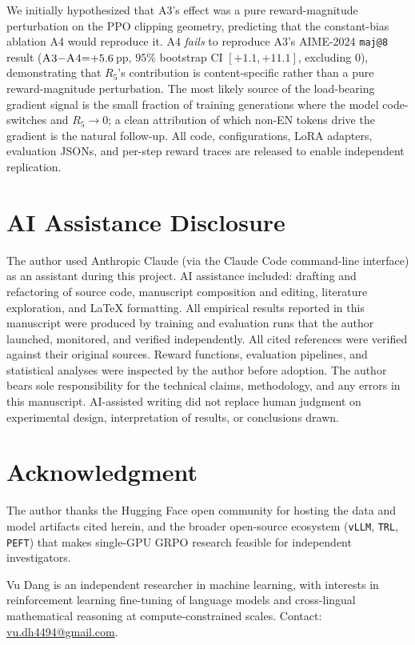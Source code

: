 \documentclass[journal,onecolumn,11pt]{IEEEtran}
\newcommand{\armC}{\textsc{A3}}
\newcommand{\armD}{\textsc{A4}}
\newcommand{\R}[1]{R_{#1}}
\begin{document}
We initially hypothesized that \armC{}'s effect was a pure
reward-magnitude perturbation on the PPO clipping geometry, predicting
that the constant-bias ablation \armD{} would reproduce it. \armD{}
\emph{fails} to reproduce \armC{}'s AIME-2024 \texttt{maj@8} result
($\armC{}{-}\armD{}{=}{+}5.6$\,pp, $95\%$ bootstrap CI
$[+1.1, +11.1]$, excluding $0$), demonstrating that $\R{5}$'s
contribution is content-specific rather than a pure reward-magnitude
perturbation. The most likely source of the load-bearing gradient
signal is the small fraction of training generations where the model
code-switches and $\R{5}\to 0$; a clean attribution of which non-EN
tokens drive the gradient is the natural follow-up. All code,
configurations, LoRA adapters, evaluation JSONs, and per-step reward
traces are released to enable independent replication.

\section*{AI Assistance Disclosure}
The author used Anthropic Claude (via the Claude Code command-line interface)
as an assistant during this project. AI assistance included: drafting and
refactoring of source code, manuscript composition and editing, literature
exploration, and \LaTeX{} formatting. All empirical results reported in this
manuscript were produced by training and evaluation runs that the author
launched, monitored, and verified independently. All cited references were
verified against their original sources. Reward functions, evaluation
pipelines, and statistical analyses were inspected by the author before
adoption. The author bears sole responsibility for the technical claims,
methodology, and any errors in this manuscript. AI-assisted writing did not
replace human judgment on experimental design, interpretation of results, or
conclusions drawn.

\section*{Acknowledgment}
The author thanks the Hugging Face open community for hosting the data and
model artifacts cited herein, and the broader open-source ecosystem
(\texttt{vLLM}, \texttt{TRL}, \texttt{PEFT}) that makes single-GPU GRPO
research feasible for independent investigators.




\vspace{4pt}
\begin{IEEEbiographynophoto}{Vu Dang}
is an independent researcher in machine learning, with interests in
reinforcement learning fine-tuning of language models and cross-lingual
mathematical reasoning at compute-constrained scales. Contact:
\href{mailto:vu.dh4494@gmail.com}{vu.dh4494@gmail.com}.
\end{IEEEbiographynophoto}
\end{document}
